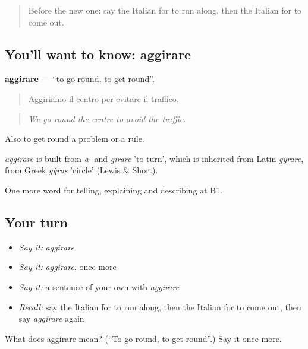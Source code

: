 \label{lesson:IT-C442-aggirare}



\begin{quote}
Before the new one: say the Italian for to run along, then the Italian for to come out.
\end{quote}

\subsection*{You'll want to know: aggirare}
\textbf{aggirare} — \textquotedblleft{}to go round, to get round\textquotedblright{}.

\begin{quote}
Aggiriamo il centro per evitare il traffico.
\end{quote}

\begin{quote}
\emph{We go round the centre to avoid the traffic.}
\end{quote}

Also to get round a problem or a rule.

\begin{cousinweb}
\emph{aggirare} is built from \emph{a-} and \emph{girare} 'to turn', which is inherited from Latin \emph{gyrāre}, from Greek \emph{gŷros} 'circle' (Lewis \& Short).
\end{cousinweb}

\begin{grammarlens}[title={What you've built}]
One more word for telling, explaining and describing at B1.
\end{grammarlens}

\subsection*{Your turn}
\begin{itemize}
\raggedright
  \item \emph{Say it:} \emph{aggirare}
  \item \emph{Say it:} \emph{aggirare}, once more
  \item \emph{Say it:} a sentence of your own with \emph{aggirare}
  \item \emph{Recall:} say the Italian for to run along, then the Italian for to come out, then say \emph{aggirare} again
\end{itemize}

\begin{tcolorbox}[breakable,colback=teal!4,colframe=teal!35!black,title={Before you move on}]
What does aggirare mean? (\textquotedblleft{}To go round, to get round\textquotedblright{}.) Say it once more.
\end{tcolorbox}
